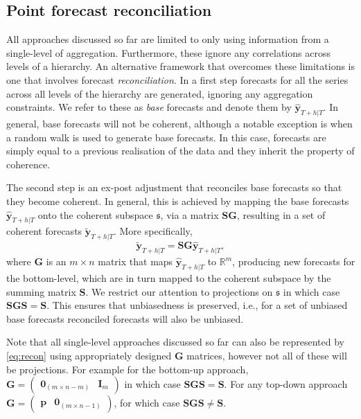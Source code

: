 \documentclass[graybox]{svmult}
\begin{document}
\subsection{Point forecast reconciliation}\label{sec:reconciliation approaches}

All approaches discussed so far are limited to only using information from a single-level of aggregation. Furthermore, these ignore any correlations across levels of a hierarchy. An alternative framework that overcomes these limitations is one that involves forecast \textit{reconciliation}. In a first step forecasts for all the series across all levels of the hierarchy are generated, ignoring any aggregation constraints. We refer to these as \textit{base} forecasts and denote them by $\hat{\bm{y}}_{T+h|T}$. In general, base forecasts will not be coherent, although a notable exception is when a random walk is used to generate base forecasts. In this case, forecasts are simply equal to a previous realisation of the data and they inherit the property of coherence.

The second step is an ex-post adjustment that reconciles base forecasts so that they become coherent. In general, this is achieved by mapping the base forecasts $\hat{\bm{y}}_{T+h|T}$ onto the coherent subspace $\mathfrak{s}$, via a matrix $\bm{SG}$, resulting in a set of coherent forecasts $\tilde{\bm{y}}_{T+h|T}$. More specifically,
\begin{equation}\label{eq:recon}
\tilde{\bm{y}}_{T+h|T}=\bm{S}\bm{G}\hat{\bm{y}}_{T+h|T},
\end{equation}
where $\bm{G}$ is an $m\times n$ matrix that maps $\hat{\bm{y}}_{T+h|T}$ to $\mathbb{R}^m$, producing new forecasts for the bottom-level, which are in turn mapped to the coherent subspace by the summing matrix $\bm{S}$. We restrict our attention to projections on $\mathfrak{s}$ in which case $\bm{SGS}=\bm{S}$. This ensures that unbiasedness is preserved, i.e., for a set of unbiased base forecasts reconciled forecasts will also be unbiased.

Note that all single-level approaches discussed so far can also be represented by \eqref{eq:recon} using appropriately designed $\bm{G}$ matrices, however not all of these will be projections. For example for the bottom-up approach, $\bm{G}=\begin{pmatrix}
\bm{0}_{(m \times n-m)} & \bm{I}_m
\end{pmatrix}$ in which case $\bm{SGS}=\bm{S}$. For any top-down approach
$\bm{G}=\begin{pmatrix}
\bm{p} & \bm{0}_{(m \times n-1)}
\end{pmatrix}$, for which case $\bm{SGS}\ne\bm{S}$.
\end{document}
